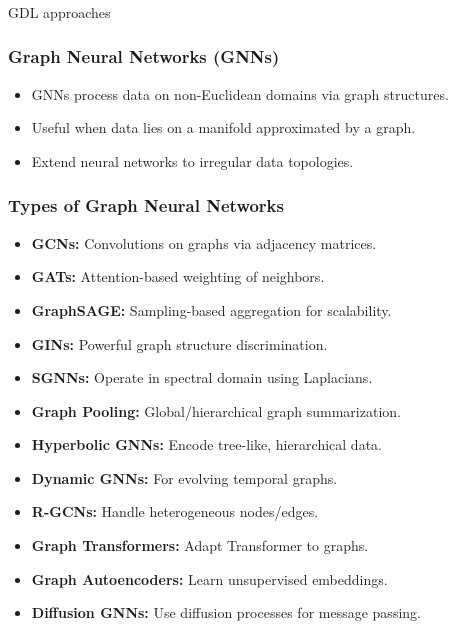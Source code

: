 \begin{frame}[fragile]\frametitle{}
\begin{center}
{\Large GDL approaches}
\end{center}
\end{frame}

\begin{frame}[fragile]\frametitle{Graph Neural Networks (GNNs)}
  \begin{itemize}
    \item GNNs process data on non-Euclidean domains via graph structures.
    \item Useful when data lies on a manifold approximated by a graph.
    \item Extend neural networks to irregular data topologies.
  \end{itemize}
\end{frame}

\begin{frame}[fragile]\frametitle{Types of Graph Neural Networks}
  \begin{itemize}
    \item \textbf{GCNs:} Convolutions on graphs via adjacency matrices.
    \item \textbf{GATs:} Attention-based weighting of neighbors.
    \item \textbf{GraphSAGE:} Sampling-based aggregation for scalability.
    \item \textbf{GINs:} Powerful graph structure discrimination.
    \item \textbf{SGNNs:} Operate in spectral domain using Laplacians.
    \item \textbf{Graph Pooling:} Global/hierarchical graph summarization.
    \item \textbf{Hyperbolic GNNs:} Encode tree-like, hierarchical data.
    \item \textbf{Dynamic GNNs:} For evolving temporal graphs.
    \item \textbf{R-GCNs:} Handle heterogeneous nodes/edges.
    \item \textbf{Graph Transformers:} Adapt Transformer to graphs.
    \item \textbf{Graph Autoencoders:} Learn unsupervised embeddings.
    \item \textbf{Diffusion GNNs:} Use diffusion processes for message passing.
  \end{itemize}
\end{frame}

